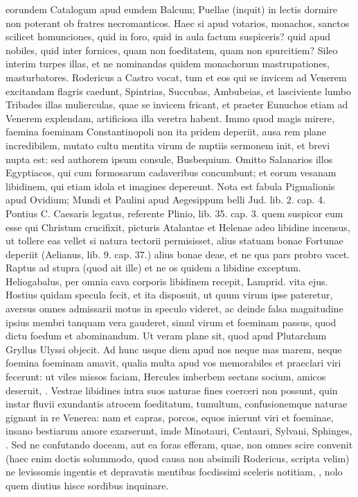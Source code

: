 {eorundem Catalogum apud eundem Balcum; Puellae (inquit) in lectis
dormire non poterant ob fratres necromanticos. Haec si apud votarios,
monachos, sanctos scilicet homunciones, quid in foro, quid in aula
factum suspiceris? quid apud nobiles, quid inter fornices, quam non
foeditatem, quam non spurcitiem? Sileo interim turpes illas, et ne
nominandas quidem monachorum  mastrupationes, masturbatores.
Rodericus a Castro vocat, tum et eos qui se invicem ad Venerem
excitandam flagris caedunt, Spintrias, Succubas, Ambubeias, et
lasciviente lumbo Tribades illas mulierculas, quae se invicem fricant,
et praeter Eunuchos etiam ad Venerem explendam, artificiosa illa
veretra habent. Immo quod magis mirere, faemina foeminam
Constantinopoli non ita pridem deperiit, ausa rem plane incredibilem,
mutato cultu mentita virum de nuptiis sermonem init, et brevi nupta
est: sed authorem ipsum consule, Busbequium. Omitto Salanarios
illos Egyptiacos, qui cum formosarum cadaveribus concumbunt; et eorum
vesanam libidinem, qui etiam idola et imagines depereunt. Nota est
fabula Pigmalionis apud Ovidium; Mundi et Paulini apud Aegesippum
belli Jud. lib. 2. cap. 4. Pontius C. Caesaris legatus, referente
Plinio, lib. 35. cap. 3. quem suspicor eum esse qui Christum
crucifixit, picturis Atalantae et Helenae adeo libidine incensus, ut
tollere eas vellet si natura tectorii permisisset, alius statuam bonae
Fortunae deperiit (Aelianus, lib. 9. cap. 37.) alius bonae deae, et ne
qua pars probro vacet. Raptus ad stupra (quod ait ille) et ne
os quidem a libidine exceptum. Heliogabalus, per omnia cava
corporis libidinem recepit, Lamprid. vita ejus. Hostius quidam
specula fecit, et ita disposuit, ut quum virum ipse pateretur, aversus
omnes admissarii motus in speculo videret, ac deinde falsa magnitudine
ipsius membri tanquam vera gauderet, simul virum et foeminam passus,
quod dictu foedum et abominandum. Ut veram plane sit, quod apud
Plutarchum Gryllus Ulyssi objecit. Ad hunc usque diem apud nos
neque mas marem, neque foemina foeminam amavit, qualia multa apud vos
memorabiles et praeclari viri fecerunt: ut viles missos faciam,
Hercules imberbem sectans socium, amicos deseruit, \etc{}. Vestrae
libidines intra suos naturae fines coerceri non possunt, quin instar
fluvii exundantis atrocem foeditatum, tumultum, confusionemque naturae
gignant in re Venerea: nam et capras, porcos, equos inierunt viri et
foeminae, insano bestiarum amore exarserunt, imde Minotauri, Centauri,
Sylvani, Sphinges, \etc{}. Sed ne confutando doceam, aut ea foras efferam,
quae, non omnes scire convenit (haec enim doctis solummodo, quod causa
non absimili Rodericus, scripta velim) ne levissomis ingentis et
depravatis mentibus focdissimi sceleris notitiam, \etc{}, nolo quem
diutius hisce sordibus inquinare.

}
